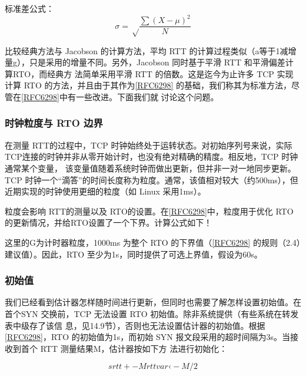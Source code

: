 \begin{tcolorbox}
    标准差公式：
    \begin{equation}
        \sigma = \sqrt\frac{\sum{(X-\mu)^2}}{N}
    \end{equation}
\end{tcolorbox}
比较经典方法与 Jacobson 的计算方法，平均 RTT 的计算过程类似（a等于1减增量g），只是采用的增量不同。另外，Jacobson 同时基于平滑 RTT 和平滑偏差计算RTO，而经典方
法简单采用平滑 RTT 的倍数。这是迄今为止许多 TCP 实现计算 RTO 的方法，并且由于其作为\href{https://www.rfc-editor.org/rfc/rfc6298}{[RFC6298]} 的基础，我们称其为标准方法，尽管在\href{https://www.rfc-editor.org/rfc/rfc6298}{[RFC6298]}中有一些改进。下面我们就
讨论这个问题。

\subsubsection{时钟粒度与 RTO 边界}

在测量 RTT的过程中，TCP 时钟始终处于运转状态。对初始序列号来说，实际TCP连接的时钟并非从零开始计时，也没有绝对精确的精度。相反地，TCP 时钟通常某个变量，
该变量值随着系统时钟而做出更新，但并非一对一地同步更新。TCP 时钟一个“滴答”的时间长度称为粒度。通常，该值相对较大（约500ms），但近期实现的时钟使用更细的粒度（如
Linux 采用1ms）。

粒度会影响 RTT的测量以及 RTO的设置。在\href{https://www.rfc-editor.org/rfc/rfc6298}{[RFC6298]}中，粒度用于优化 RTO 的更新情况，并给RTO设置了一个下界。计算公式如下！

这里的G为计时器粒度，1000ms 为整个 RTO 的下界值（\href{https://www.rfc-editor.org/rfc/rfc6298}{[RFC6298]} 的规则（2.4）建议值）。因此，RTO 至少为1s，同时提供了可选上界值，假设为60s。

\subsubsection{初始值}

我们已经看到估计器怎样随时间进行更新，但同时也需要了解怎样设置初始值。在首个SYN 交换前，TCP 无法设置 RTO 初始值。除非系统提供（有些系统在转发表中级存了该信
息，见14.9节），否则也无法设置估计器的初始值。根据\href{https://www.rfc-editor.org/rfc/rfc6298}{[RFC6298]}，RTO 的初始值为1s，而初始 SYN 报文段采用的超时间隔为3s。当接收到首个 RTT 测量结果M，估计器按如下方
法进行初始化：

\begin{equation}
    srtt +- M
    rttvar ‹- M/2
\end{equation}

